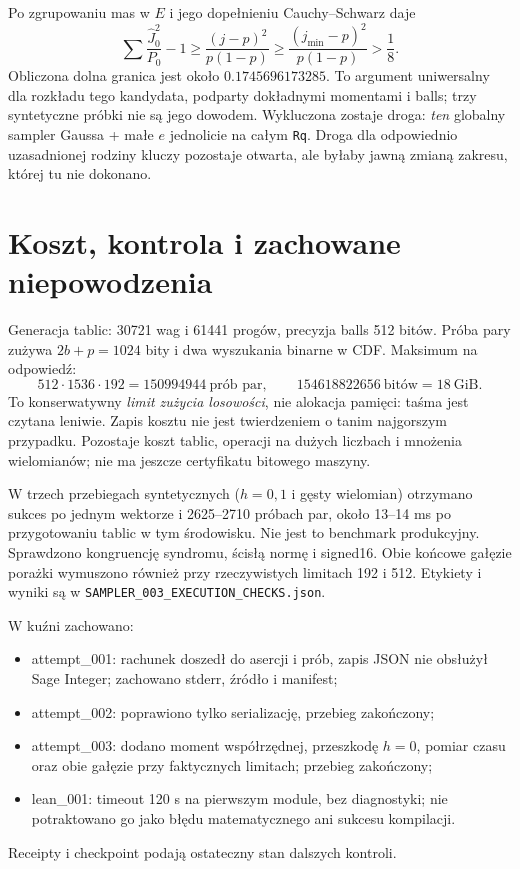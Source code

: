 \documentclass[11pt,a4paper]{article}
\newcommand{\code}[1]{\nolinkurl{#1}}
\begin{document}
Po zgrupowaniu mas w $E$ i jego dopełnieniu Cauchy--Schwarz daje
\[
 \sum\frac{\widehat J_0^2}{P_0}-1
 \ge\frac{(j-p)^2}{p(1-p)}
 \ge\frac{(j_{\min}-p)^2}{p(1-p)}>\frac18.
\]
Obliczona dolna granica jest około $0.1745696173285$.
To argument uniwersalny dla rozkładu tego kandydata, podparty dokładnymi
momentami i balls; trzy syntetyczne próbki nie są jego dowodem.
Wykluczona zostaje droga: \emph{ten} globalny sampler Gaussa + małe $e$
jednolicie na całym \code{Rq}. Droga dla odpowiednio uzasadnionej rodziny
kluczy pozostaje otwarta, ale byłaby jawną zmianą zakresu, której tu nie dokonano.

\section{Koszt, kontrola i zachowane niepowodzenia}
Generacja tablic: 30721 wag i 61441 progów, precyzja balls 512 bitów.
Próba pary zużywa $2b+p=1024$ bity i dwa wyszukania binarne w CDF.
Maksimum na odpowiedź:
\[
 512\cdot1536\cdot192=150994944\ \text{prób par},\qquad
 154618822656\ \text{bitów} =18\ \text{GiB}.
\]
To konserwatywny \emph{limit zużycia losowości}, nie alokacja pamięci:
taśma jest czytana leniwie. Zapis kosztu nie jest twierdzeniem o tanim
najgorszym przypadku. Pozostaje koszt tablic, operacji na dużych liczbach
i mnożenia wielomianów; nie ma jeszcze certyfikatu bitowego maszyny.

W trzech przebiegach syntetycznych ($h=0,1$ i gęsty wielomian) otrzymano
sukces po jednym wektorze i 2625--2710 próbach par, około 13--14 ms
po przygotowaniu tablic w tym środowisku. Nie jest to benchmark produkcyjny.
Sprawdzono kongruencję syndromu, ścisłą normę i signed16.
Obie końcowe gałęzie porażki wymuszono również przy rzeczywistych limitach
192 i 512. Etykiety i wyniki są w \code{SAMPLER_003_EXECUTION_CHECKS.json}.

W kuźni zachowano:
\begin{itemize}
\item attempt\_001: rachunek doszedł do asercji i prób, zapis JSON nie
obsłużył Sage Integer; zachowano stderr, źródło i manifest;
\item attempt\_002: poprawiono tylko serializację, przebieg zakończony;
\item attempt\_003: dodano moment współrzędnej, przeszkodę $h=0$,
pomiar czasu oraz obie gałęzie przy faktycznych limitach; przebieg zakończony;
\item lean\_001: timeout 120 s na pierwszym module, bez diagnostyki;
nie potraktowano go jako błędu matematycznego ani sukcesu kompilacji.
\end{itemize}
Receipty i checkpoint podają ostateczny stan dalszych kontroli.
\end{document}
